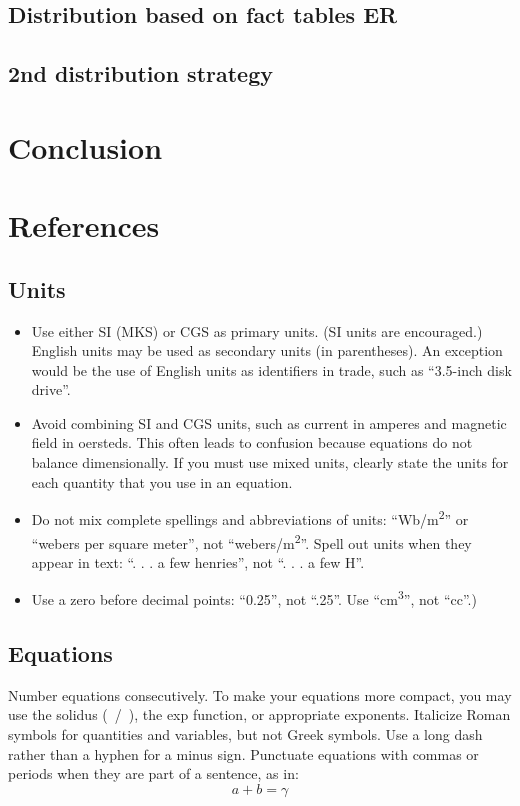 \documentclass[conference]{IEEEtran}
\begin{document}
\subsection{Distribution based on fact tables ER}
\label{sec:distribution-based-on-fact-tables-er}


\subsection{2nd distribution strategy}
\label{sec:2nd-distribution-strategy}

\section{Conclusion}
\section{References}
\subsection{Units}
\begin{itemize}
	\item Use either SI (MKS) or CGS as primary units. (SI units are encouraged.) English units may be used as secondary units (in parentheses). An exception would be the use of English units as identifiers in trade, such as ``3.5-inch disk drive''.
	\item Avoid combining SI and CGS units, such as current in amperes and magnetic field in oersteds. This often leads to confusion because equations do not balance dimensionally. If you must use mixed units, clearly state the units for each quantity that you use in an equation.
	\item Do not mix complete spellings and abbreviations of units: ``Wb/m\textsuperscript{2}'' or ``webers per square meter'', not ``webers/m\textsuperscript{2}''. Spell out units when they appear in text: ``. . . a few henries'', not ``. . . a few H''.
	\item Use a zero before decimal points: ``0.25'', not ``.25''. Use ``cm\textsuperscript{3}'', not ``cc''.)
\end{itemize}

\subsection{Equations}
Number equations consecutively. To make your
equations more compact, you may use the solidus (~/~), the exp function, or
appropriate exponents. Italicize Roman symbols for quantities and variables,
but not Greek symbols. Use a long dash rather than a hyphen for a minus
sign. Punctuate equations with commas or periods when they are part of a
sentence, as in:
\begin{equation}
	a+b=\gamma\label{eq}
\end{equation}
\end{document}

